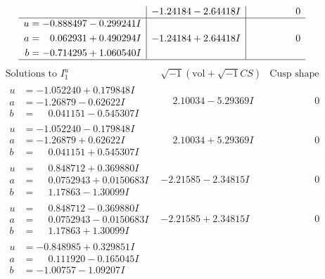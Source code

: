 \documentclass[1p]{elsarticle_modified}
\theoremstyle{definition}
\newcommand{\I}{\sqrt{-1}}
\begin{document}
$$\begin{array}{c|c|c}
 & -1.24184 - 2.64418 I & \phantom{-0.000000 } 0 \\ \hline\begin{aligned}
u &= -0.888497 - 0.299241 I \\
a &= \phantom{-}0.062931 + 0.490294 I \\
b &= -0.714295 + 1.060540 I\end{aligned}
 & -1.24184 + 2.64418 I & \phantom{-0.000000 } 0\\
 \hline 
 \end{array}$$\newpage$$\begin{array}{c|c|c}  
\text{Solutions to }I^u_{1}& \I (\text{vol} + \sqrt{-1}CS) & \text{Cusp shape}\\
 \hline 
\begin{aligned}
u &= -1.052240 + 0.179848 I \\
a &= -1.26879 - 0.62622 I \\
b &= \phantom{-}0.041151 - 0.545307 I\end{aligned}
 & \phantom{-}2.10034 - 5.29369 I & \phantom{-0.000000 } 0 \\ \hline\begin{aligned}
u &= -1.052240 - 0.179848 I \\
a &= -1.26879 + 0.62622 I \\
b &= \phantom{-}0.041151 + 0.545307 I\end{aligned}
 & \phantom{-}2.10034 + 5.29369 I & \phantom{-0.000000 } 0 \\ \hline\begin{aligned}
u &= \phantom{-}0.848712 + 0.369880 I \\
a &= \phantom{-}0.0752943 + 0.0150683 I \\
b &= \phantom{-}1.17863 - 1.30099 I\end{aligned}
 & -2.21585 - 2.34815 I & \phantom{-0.000000 } 0 \\ \hline\begin{aligned}
u &= \phantom{-}0.848712 - 0.369880 I \\
a &= \phantom{-}0.0752943 - 0.0150683 I \\
b &= \phantom{-}1.17863 + 1.30099 I\end{aligned}
 & -2.21585 + 2.34815 I & \phantom{-0.000000 } 0 \\ \hline\begin{aligned}
u &= -0.848985 + 0.329851 I \\
a &= \phantom{-}0.111920 - 0.165045 I \\
b &= -1.00757 - 1.09207 I\end{aligned}

\end{array}$$
\end{document}
